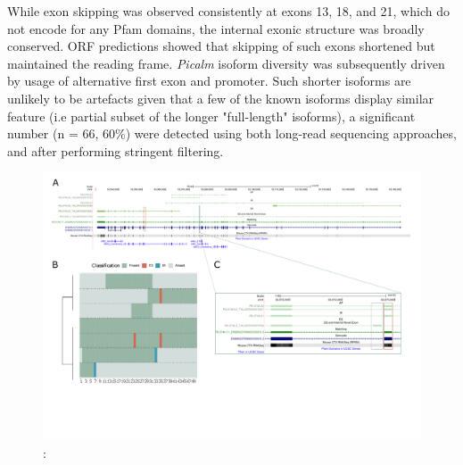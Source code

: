 While exon skipping was observed consistently at exons 13, 18, and 21, which do not encode for any Pfam domains, the internal exonic structure was broadly conserved. ORF predictions showed that skipping of such exons shortened but maintained the reading frame. \textit{Picalm} isoform diversity was subsequently driven by usage of alternative first exon and promoter. Such shorter isoforms are unlikely to be artefacts given that a few of the known isoforms display similar feature (i.e partial subset of the longer "full-length" isoforms), a significant number (n = 66, 60\%) were detected using both long-read sequencing approaches, and after performing stringent filtering. 


\begin{landscape}
	\begin{figure}[htp]
		\begin{center}
			\includegraphics[page=8,trim={0 1cm 0 0},scale = 0.85]{Figures/TargetGenes_Annotation_Landscape.pdf}
		\end{center}
		\captionsetup{width=0.95\textwidth}
		\caption[RNA-Seq defined transcriptome]%
		{\textbf{}: }   
		\label{fig:picalm}
	\end{figure}
\end{landscape} 

